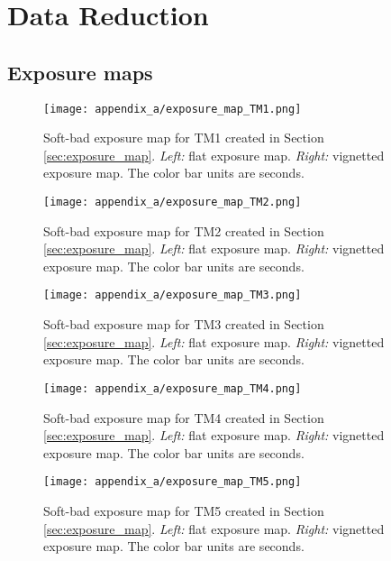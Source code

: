 \chapter{Data Reduction}
\section{Exposure maps}\label{sec:appendix_a_exposure_map}
%
\begin{figure}[htbp]
    \centering
    \texttt{[image: appendix\_a/exposure\_map\_TM1.png]}
    \caption[Exposure maps for TM1.]{Soft-bad exposure map for TM1 created in Section \ref{sec:exposure_map}. \textit{Left:} flat exposure map. \textit{Right:} vignetted exposure map. The color bar units are seconds.}
    \label{fig:TM1}
\end{figure}

\begin{figure}[htbp]
    \centering
    \texttt{[image: appendix\_a/exposure\_map\_TM2.png]}
    \caption[Exposure maps for TM2.]{Soft-bad exposure map for TM2 created in Section \ref{sec:exposure_map}. \textit{Left:} flat exposure map. \textit{Right:} vignetted exposure map. The color bar units are seconds.}
    \label{fig:TM2}
\end{figure}

\begin{figure}[htbp]
    \centering
    \texttt{[image: appendix\_a/exposure\_map\_TM3.png]}
    \caption[Exposure maps for TM3.]{Soft-bad exposure map for TM3 created in Section \ref{sec:exposure_map}. \textit{Left:} flat exposure map. \textit{Right:} vignetted exposure map. The color bar units are seconds.}
    \label{fig:TM3}
\end{figure}

\begin{figure}[htbp]
    \centering
    \texttt{[image: appendix\_a/exposure\_map\_TM4.png]}
    \caption[Exposure maps for TM4.]{Soft-bad exposure map for TM4 created in Section \ref{sec:exposure_map}. \textit{Left:} flat exposure map. \textit{Right:} vignetted exposure map. The color bar units are seconds.}
    \label{fig:TM4}
\end{figure}

\begin{figure}[htbp]
    \centering
    \texttt{[image: appendix\_a/exposure\_map\_TM5.png]}
    \caption[Exposure maps for TM5.]{Soft-bad exposure map for TM5 created in Section \ref{sec:exposure_map}. \textit{Left:} flat exposure map. \textit{Right:} vignetted exposure map. The color bar units are seconds.}
    \label{fig:TM5}
\end{figure}

